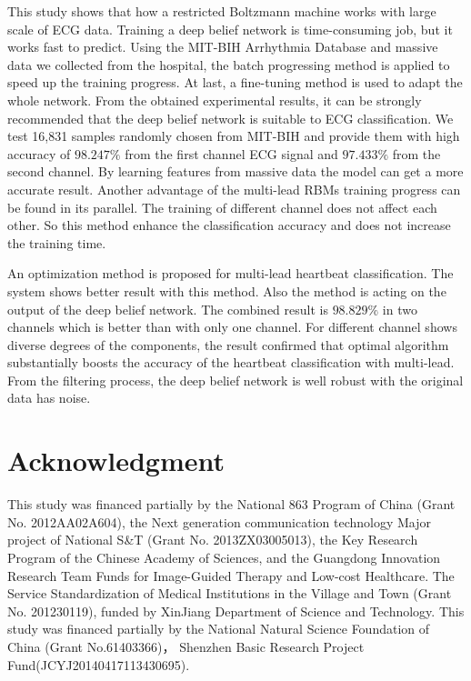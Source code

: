 \documentclass[conference]{IEEEtran}
\begin{document}
This study shows that how a restricted Boltzmann machine works with large scale of ECG data.  Training a deep belief network is time-consuming job, but it works fast to predict. Using the MIT-BIH Arrhythmia Database \cite{Goldberger} and massive data we collected from the hospital, the batch progressing method is applied to speed up the training progress. At last, a fine-tuning method is used to adapt the whole network. From the obtained experimental results, it can be strongly recommended that the deep belief network is suitable to ECG classification. We test 16,831 samples randomly chosen from MIT-BIH and provide them with high accuracy of $98.247\%$ from the first channel ECG signal and $97.433\%$ from the second channel. By learning features from massive data the model can get a more accurate result. Another advantage of the multi-lead RBMs training progress can be found in its parallel. The training of different channel does not affect each other. So this method enhance the classification accuracy and does not increase the training time.

An optimization method is proposed for multi-lead heartbeat classification. The system shows better result with this method. Also the method is acting on the output of the deep belief network. The combined result is $98.829\%$ in two channels which is better than with only one channel. For different channel shows diverse degrees of the components, the result confirmed that optimal algorithm substantially boosts the accuracy of the heartbeat classification with multi-lead. From the filtering process, the deep belief network is well robust with the original data has noise. 

\section*{Acknowledgment}
This study was financed partially by the National 863 Program of China (Grant No. 2012AA02A604), the Next generation communication technology Major project of National S\&T (Grant No. 2013ZX03005013), the Key Research Program of the Chinese Academy of Sciences, and the Guangdong Innovation Research Team Funds for Image-Guided Therapy and Low-cost Healthcare. The Service Standardization of Medical Institutions in the Village and Town (Grant No. 201230119), funded by XinJiang Department of Science and Technology. This study was financed partially by the National Natural Science Foundation of China (Grant No.61403366)， Shenzhen Basic Research Project Fund(JCYJ20140417113430695).
\end{document}
